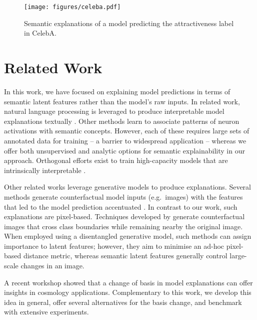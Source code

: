 \documentclass{article}
\begin{document}
\begin{figure}[!t]
\centering
\texttt{[image: figures/celeba.pdf]}
\caption{Semantic explanations of a model predicting the attractiveness label in CelebA.}
\centering
\label{fig:celeba}
\end{figure}


\section{Related Work}
\label{sec:related-work}


In this work, we have focused on explaining model predictions in terms of semantic latent features rather than the model's raw inputs. In related work, natural language processing is leveraged to produce interpretable model explanations textually \citep{GroundingVisualExplantions,NLPexplanation}. Other methods \citep{ConceptActivationVectors,InterpretableBasisDecomposition} learn to associate patterns of neuron activations with semantic concepts. However, each of these requires large sets of annotated data for training -- a barrier to widespread application -- whereas we offer both unsupervised and analytic options for semantic explainability in our approach. Orthogonal efforts exist to train high-capacity models that are intrinsically interpretable \citep{SelfExplainingNN,ThisLooksLikesThat}. 

Other related works leverage generative models to produce explanations. Several methods generate counterfactual model inputs (e.g.~images) with the features that led to the model prediction accentuated \citep{ExplanationByExageration,ExplainGAN,AuditingClassifiers}. In contrast to our work, such explanations are pixel-based. Techniques developed by \cite{CounterfactualIntrospection} generate counterfactual images that cross class boundaries while remaining nearby the original image. When employed using a disentangled generative model, such methods can assign importance to latent features; however, they aim to minimise an ad-hoc pixel-based distance metric, whereas semantic latent features generally control large-scale changes in an image.

A recent workshop \citep{singh2020transformation} showed that a change of basis in model explanations can offer insights in cosmology applications. Complementary to this work, we develop this idea in general, offer several alternatives for the basis change, and benchmark with extensive experiments. 
\end{document}
